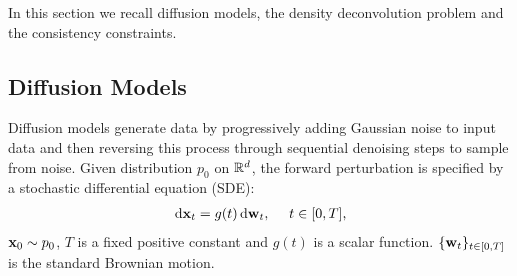 In this section we recall diffusion models, the density deconvolution problem and the consistency constraints.%
\subsection{Diffusion Models}
Diffusion models generate data by progressively adding Gaussian noise to input data and then reversing this process through sequential denoising steps to sample from noise. Given distribution $p_0$ on $\mathbb{R}^d$, the forward perturbation is specified by a stochastic differential equation (SDE):
\begin{align}
	\,\mathrm{d} \mathbf{x}_t = g(t) \,\mathrm{d} \mathbf{w}_t, ~~\textrm{~ $t\in [0, T]$,} \label{eq:fwd_diff}
\end{align}
$\mathbf{x}_0 \sim p_0$, $T$ is a fixed positive constant and $g(t)$ is a scalar function.  $\{\mathbf{w}_t\}_{t\in [0,T]}$ is the standard Brownian motion. 




